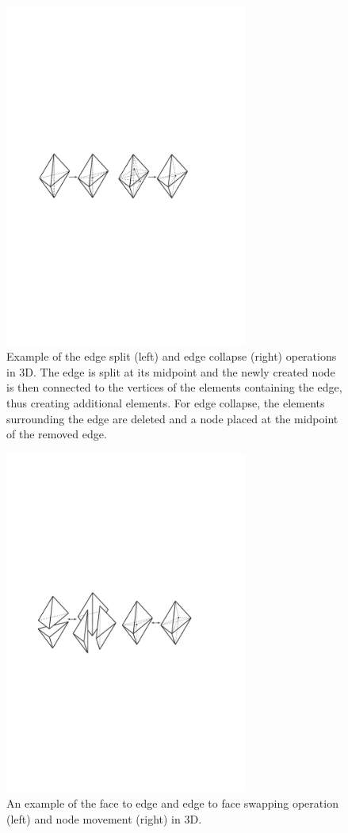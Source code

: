 \begin{figure}
\centering
\noindent\includegraphics[width=8.0cm]{images/EdgeSplitCollapse}
\caption{Example of the edge split (left) and edge collapse (right)
  operations in 3D. The edge is split at its midpoint and the newly
  created node is then connected to the vertices of the elements
  containing the edge, thus creating additional elements. For edge
  collapse, the elements surrounding the edge are deleted and a node
  placed at the midpoint of the removed edge.}
\label{Fig:EdgeSplit}
\end{figure}
\begin{figure}
\centering
\noindent\includegraphics[width=8cm]{images/EdgeFaceNodeMove}
\caption{An example of the face to edge and edge to face swapping
  operation (left) and node movement (right) in 3D.}
\label{Fig:face2edge}
\end{figure}

